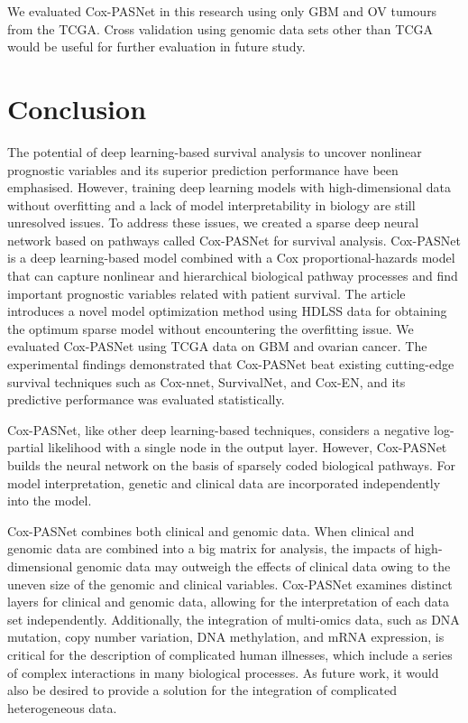 \documentclass[10pt,twocolumn,twoside,lineno]{gsajnl}
\begin{document}
We evaluated Cox-PASNet in this research using only GBM and OV tumours from the TCGA. Cross validation using genomic data sets other than TCGA would be useful for further evaluation in future study.
\section{Conclusion}

The potential of deep learning-based survival analysis to uncover nonlinear prognostic variables and its superior prediction performance have been emphasised. However, training deep learning models with high-dimensional data without overfitting and a lack of model interpretability in biology are still unresolved issues. To address these issues, we created a sparse deep neural network based on pathways called Cox-PASNet for survival analysis. Cox-PASNet is a deep learning-based model combined with a Cox proportional-hazards model that can capture nonlinear and hierarchical biological pathway processes and find important prognostic variables related with patient survival. The article introduces a novel model optimization method using HDLSS data for obtaining the optimum sparse model without encountering the overfitting issue. We evaluated Cox-PASNet using TCGA data on GBM and ovarian cancer. The experimental findings demonstrated that Cox-PASNet beat existing cutting-edge survival techniques such as Cox-nnet, SurvivalNet, and Cox-EN, and its predictive performance was evaluated statistically.


Cox-PASNet, like other deep learning-based techniques, considers a negative log-partial likelihood with a single node in the output layer. However, Cox-PASNet builds the neural network on the basis of sparsely coded biological pathways. For model interpretation, genetic and clinical data are incorporated independently into the model.


Cox-PASNet combines both clinical and genomic data. When clinical and genomic data are combined into a big matrix for analysis, the impacts of high-dimensional genomic data may outweigh the effects of clinical data owing to the uneven size of the genomic and clinical variables. Cox-PASNet examines distinct layers for clinical and genomic data, allowing for the interpretation of each data set independently. Additionally, the integration of multi-omics data, such as DNA mutation, copy number variation, DNA methylation, and mRNA expression, is critical for the description of complicated human illnesses, which include a series of complex interactions in many biological processes. As future work, it would also be desired to provide a solution for the integration of complicated heterogeneous data.
\end{document}
